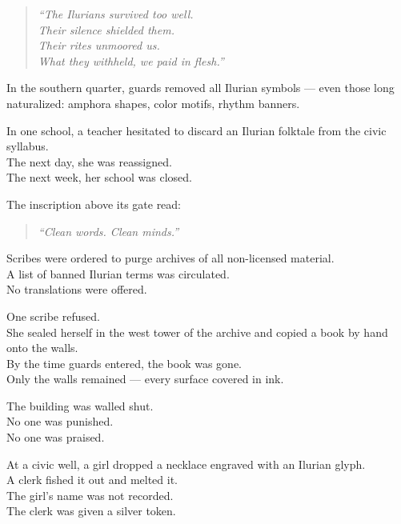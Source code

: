 \documentclass[12pt]{article}
\begin{document}
\begin{quote}
\textit{“The Ilurians survived too well.}\\
\textit{Their silence shielded them.}\\
\textit{Their rites unmoored us.}\\
\textit{What they withheld, we paid in flesh.”}
\end{quote}

\vspace{1em}

In the southern quarter, guards removed all Ilurian symbols — even those long naturalized: amphora shapes, color motifs, rhythm banners.

In one school, a teacher hesitated to discard an Ilurian folktale from the civic syllabus.\\
The next day, she was reassigned.\\
The next week, her school was closed.

The inscription above its gate read:

\begin{quote}
\textit{“Clean words. Clean minds.”}
\end{quote}

\vspace{1em}

Scribes were ordered to purge archives of all non-licensed material.\\
A list of banned Ilurian terms was circulated.\\
No translations were offered.

One scribe refused.\\
She sealed herself in the west tower of the archive and copied a book by hand onto the walls.\\
By the time guards entered, the book was gone.\\
Only the walls remained — every surface covered in ink.

The building was walled shut.\\
No one was punished.\\
No one was praised.

\vspace{1em}

At a civic well, a girl dropped a necklace engraved with an Ilurian glyph.\\
A clerk fished it out and melted it.\\
The girl’s name was not recorded.\\
The clerk was given a silver token.
\end{document}
